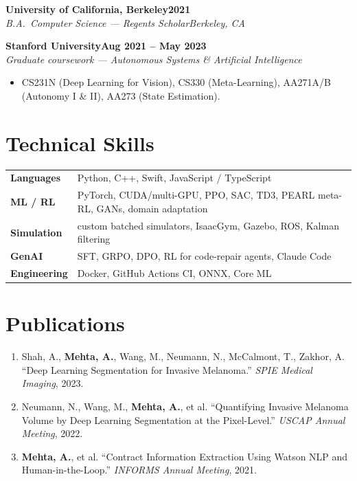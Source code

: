 \documentclass[10pt]{article}
\newcommand{\role}[4]{\par\vspace{3pt}\textbf{#1}\hfill\textbf{#2}\\\textit{#3}\hfill\textit{#4}}
\begin{document}
\role{University of California, Berkeley}{2021}{B.A.\ Computer Science --- Regents Scholar}{Berkeley, CA}

\role{Stanford University}{Aug 2021 -- May 2023}{Graduate coursework --- Autonomous Systems \& Artificial Intelligence}{}
\begin{itemize}
\item CS231N (Deep Learning for Vision), CS330 (Meta-Learning), AA271A/B (Autonomy I \& II), AA273 (State Estimation).
\end{itemize}

\section*{Technical Skills}
\begin{tabular}{@{}p{0.9in}l}
\textbf{Languages} & Python, C++, Swift, JavaScript / TypeScript \\
\textbf{ML / RL} & PyTorch, CUDA/multi-GPU, PPO, SAC, TD3, PEARL meta-RL, GANs, domain adaptation \\
\textbf{Simulation} & custom batched simulators, IsaacGym, Gazebo, ROS, Kalman filtering \\
\textbf{GenAI} & SFT, GRPO, DPO, RL for code-repair agents, Claude Code \\
\textbf{Engineering} & Docker, GitHub Actions CI, ONNX, Core ML \\
\end{tabular}

\section*{Publications}
\begin{enumerate}[leftmargin=1.4em,itemsep=1pt,topsep=1pt]
\item Shah, A., \textbf{Mehta, A.}, Wang, M., Neumann, N., McCalmont, T., Zakhor, A. ``Deep Learning Segmentation for Invasive Melanoma.'' \textit{SPIE Medical Imaging}, 2023.
\item Neumann, N., Wang, M., \textbf{Mehta, A.}, et al. ``Quantifying Invasive Melanoma Volume by Deep Learning Segmentation at the Pixel-Level.'' \textit{USCAP Annual Meeting}, 2022.
\item \textbf{Mehta, A.}, et al. ``Contract Information Extraction Using Watson NLP and Human-in-the-Loop.'' \textit{INFORMS Annual Meeting}, 2021.
\end{enumerate}
\end{document}
